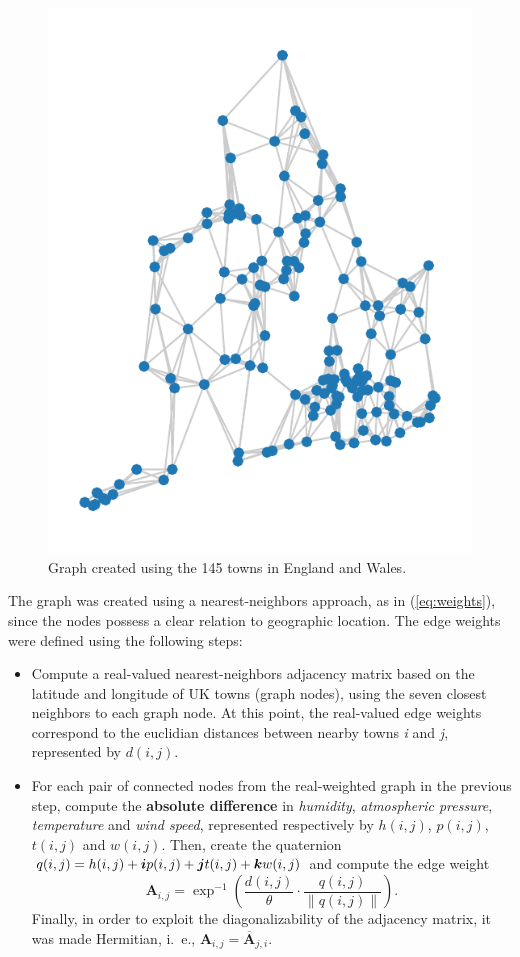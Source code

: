 \begin{figure}
    \centering
    \includegraphics[width=0.3\linewidth]{Figures/uk_example/uk_graph.pdf}
    \caption{Graph created using the 145 towns in England and Wales.}
    \label{fig:uk_graph}
\end{figure}

The graph was created using a nearest-neighbors approach, as in (\ref{eq:weights}), since the nodes possess a clear relation to geographic location. The edge weights were defined using the following steps:
\begin{itemize}[noitemsep]
    \item Compute a real-valued nearest-neighbors adjacency matrix based on the latitude and longitude of UK towns (graph nodes), using the seven closest neighbors to each graph node. At this point, the real-valued edge weights correspond to the euclidian distances between nearby towns \textit{i} and \textit{j}, represented by ${d}(i, j)$.
    \item For each pair of connected nodes from the real-weighted graph in the previous step, compute the \textbf{absolute difference} in \textit{humidity}, \textit{atmospheric pressure}, \textit{temperature} and \textit{wind speed}, represented respectively by ${h}(i, j)$, $p(i, j)$, ${t}(i, j)$ and ${w}(i, j)$. Then, create the quaternion $q(i, j) = {h}(i, j) + \boldsymbol{i} {p}(i, j) + \boldsymbol{j} {t}(i, j) + \boldsymbol{k} {w}(i, j)$ and compute the edge weight
          \begin{equation}
              \label{eq:edge_weight_qgsp}
              \mathbf{A}_{i, j} = \exp^{-1} \left(
              \frac{d(i, j)}{\theta} \cdot
              \frac{q(i, j)}{\parallel q(i, j) \parallel}
              \right).
          \end{equation}
          Finally, in order to exploit the diagonalizability of the adjacency matrix, it was made Hermitian, i.~e., $\mathbf{A}_{i, j} = \overline{\mathbf{A}}_{j, i}$.
\end{itemize}

